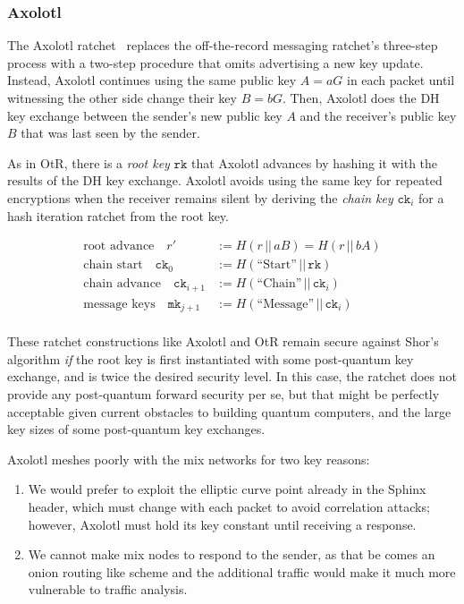 \subsubsection{Axolotl}
\def\ck{\texttt{ck}}
\def\rk{\texttt{rk}}
\def\mk{\texttt{mk}}

The Axolotl ratchet~\cite{TextSecure} replaces the off-the-record
messaging ratchet's three-step process with a two-step procedure
that omits advertising a new key update.  Instead, Axolotl continues
using the same public key $A = a G$ in each packet until witnessing
the other side change their key $B = b G$.  Then, Axolotl does the DH key
exchange between the sender's new public key $A$ and the receiver's
public key $B$ that was last seen by the sender.

As in OtR, there is a {\it root key} $\rk$ that Axolotl advances by
hashing it with the results of the DH key exchange.  Axolotl avoids using the same key for
repeated encryptions when the receiver remains silent by deriving the
{\it chain key} $\ck_i$ for a hash iteration ratchet from the root key.

\[ \begin{aligned}
\textrm{root advance}\quad
r' &:= H(r \,||\, a B) = H(r \,||\, b A) \\ %
\textrm{chain start}\quad
 \ck_0 &:= H(\textrm{``Start''} \,||\, \rk) \\
\textrm{chain advance}\quad
 \ck_{i+1} &:= H(\textrm{``Chain''} \,||\, \ck_i)  \\
\textrm{message keys}\quad
 \mk_{j+1} &:= H(\textrm{``Message''} \,||\, \ck_i)  \\
\end{aligned} \]

These ratchet constructions like Axolotl and OtR remain secure against
Shor's algorithm {\it if} the root key is first instantiated with some
post-quantum key exchange, and is twice the desired security level. 
In this case, the ratchet does not provide any post-quantum forward
security per se, but that might be perfectly acceptable given current
obstacles to building quantum computers, and the large key sizes of
some post-quantum key exchanges. 


Axolotl meshes poorly with the mix networks for two key reasons:
\begin{enumerate}
 \item
 We would prefer to exploit the elliptic curve point
 already in the Sphinx header, which must change with each packet
 to avoid correlation attacks; 
 however, Axolotl must hold its key constant until receiving a response.
 \item
 We cannot make mix nodes to respond to the sender, as that
 be comes an onion routing like scheme and the additional traffic
 would make it much more vulnerable to traffic analysis.
\end{enumerate}

